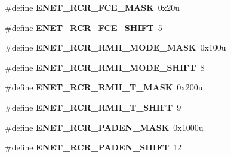 \begin{DoxyCompactItemize}
\item 
\#define {\bfseries E\+N\+E\+T\+\_\+\+R\+C\+R\+\_\+\+F\+C\+E\+\_\+\+M\+A\+SK}~0x20u\hypertarget{group__ENET__Register__Masks_ga6e58a40675d508a7590ae8bb7839c415}{}\label{group__ENET__Register__Masks_ga6e58a40675d508a7590ae8bb7839c415}

\item 
\#define {\bfseries E\+N\+E\+T\+\_\+\+R\+C\+R\+\_\+\+F\+C\+E\+\_\+\+S\+H\+I\+FT}~5\hypertarget{group__ENET__Register__Masks_ga6e69724dd9dc3b78523a31f53a661f4f}{}\label{group__ENET__Register__Masks_ga6e69724dd9dc3b78523a31f53a661f4f}

\item 
\#define {\bfseries E\+N\+E\+T\+\_\+\+R\+C\+R\+\_\+\+R\+M\+I\+I\+\_\+\+M\+O\+D\+E\+\_\+\+M\+A\+SK}~0x100u\hypertarget{group__ENET__Register__Masks_ga9064baf1508e639692ce75025526d32f}{}\label{group__ENET__Register__Masks_ga9064baf1508e639692ce75025526d32f}

\item 
\#define {\bfseries E\+N\+E\+T\+\_\+\+R\+C\+R\+\_\+\+R\+M\+I\+I\+\_\+\+M\+O\+D\+E\+\_\+\+S\+H\+I\+FT}~8\hypertarget{group__ENET__Register__Masks_ga9920faf83d3b2ac7afe335d818119e14}{}\label{group__ENET__Register__Masks_ga9920faf83d3b2ac7afe335d818119e14}

\item 
\#define {\bfseries E\+N\+E\+T\+\_\+\+R\+C\+R\+\_\+\+R\+M\+I\+I\+\_\+T\+\_\+\+M\+A\+SK}~0x200u\hypertarget{group__ENET__Register__Masks_gad12b342c371a09b9fa529abf0df4df3d}{}\label{group__ENET__Register__Masks_gad12b342c371a09b9fa529abf0df4df3d}

\item 
\#define {\bfseries E\+N\+E\+T\+\_\+\+R\+C\+R\+\_\+\+R\+M\+I\+I\+\_\+T\+\_\+\+S\+H\+I\+FT}~9\hypertarget{group__ENET__Register__Masks_gae380a88454073abac2947ac8a5959880}{}\label{group__ENET__Register__Masks_gae380a88454073abac2947ac8a5959880}

\item 
\#define {\bfseries E\+N\+E\+T\+\_\+\+R\+C\+R\+\_\+\+P\+A\+D\+E\+N\+\_\+\+M\+A\+SK}~0x1000u\hypertarget{group__ENET__Register__Masks_gab6a8c4abb6a9bd525324ca790a9255bf}{}\label{group__ENET__Register__Masks_gab6a8c4abb6a9bd525324ca790a9255bf}

\item 
\#define {\bfseries E\+N\+E\+T\+\_\+\+R\+C\+R\+\_\+\+P\+A\+D\+E\+N\+\_\+\+S\+H\+I\+FT}~12\hypertarget{group__ENET__Register__Masks_ga0aa5cc8815e76a8054a4dc13c5006118}{}\label{group__ENET__Register__Masks_ga0aa5cc8815e76a8054a4dc13c5006118}


\end{DoxyCompactItemize}
